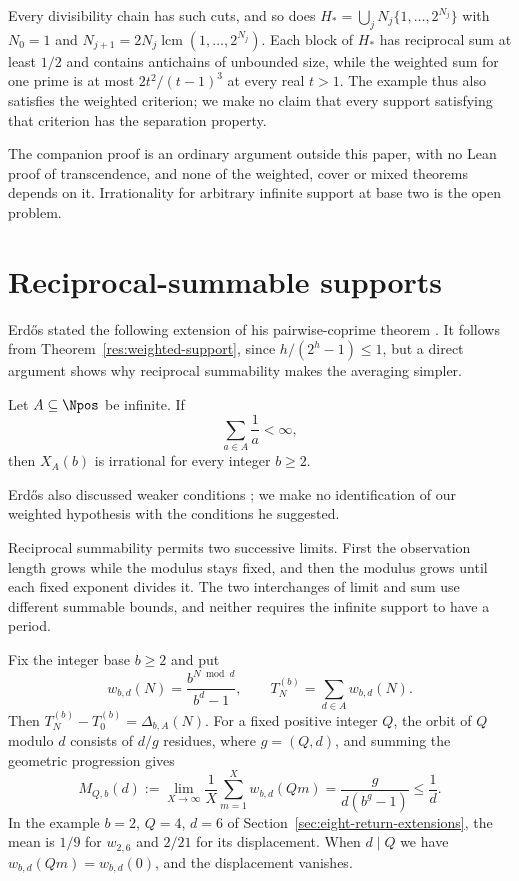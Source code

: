 \documentclass[11pt]{article}
\begin{document}
Every divisibility chain has such cuts, and so does
$H_* = \bigcup_j N_j\{1,\ldots,2^{N_j}\}$ with $N_0=1$ and
$N_{j+1}=2N_j\operatorname{lcm}(1,\ldots,2^{N_j})$. Each block of
$H_*$ has reciprocal sum at least $1/2$ and contains antichains of
unbounded size, while the weighted sum for one prime is at most
$2t^2/(t-1)^3$ at every real $t>1$. The example thus also satisfies
the weighted criterion; we make no claim that every support satisfying
that criterion has the separation property.

The companion proof is an ordinary argument outside this paper, with no
Lean proof of transcendence, and none of the weighted, cover or mixed
theorems depends on it. Irrationality for arbitrary infinite support at
base two is the open problem.

\appendix
\section{Reciprocal-summable supports}\label{sec:reciprocal-support}
Erd\H{o}s stated the following extension of his pairwise-coprime
theorem \cite[p.~222]{erdos1968}. It follows from
Theorem~\ref{res:weighted-support}, since $h/(2^h-1)\le1$, but a direct
argument shows why reciprocal summability makes the averaging simpler.

\begin{theorem}\label{res:reciprocal-support}
Let $A\subseteq\Npos$ be infinite.  If
\[
  \sum_{a\in A}\frac1a<\infty,
\]
then \(X_A(b)\) is irrational for every integer \(b\ge2\).
\end{theorem}

Erd\H{o}s also discussed weaker conditions \cite[pp.~222, 226]{erdos1968};
we make no identification of our weighted hypothesis with the conditions
he suggested.

Reciprocal summability permits two successive limits. First the
observation length grows while the modulus stays fixed, and then the
modulus grows until each fixed exponent divides it. The two
interchanges of limit and sum use different summable bounds, and
neither requires the infinite support to have a period.

Fix the integer base $b\ge2$ and put
\[
 w_{b,d}(N)=\frac{b^{N\bmod d}}{b^d-1},\qquad
 T_N^{(b)}=\sum_{d\in A}w_{b,d}(N).
\]
Then $T_N^{(b)}-T_0^{(b)}=\Delta_{b,A}(N)$. For a fixed positive
integer $Q$, the orbit of $Q$ modulo $d$ consists of $d/g$ residues,
where $g=(Q,d)$, and summing the geometric progression gives
\begin{equation}
 M_{Q,b}(d):=\lim_{X\to\infty}\frac1X\sum_{m=1}^Xw_{b,d}(Qm)
 =\frac{g}{d(b^g-1)}\le\frac1d.
 \label{eq:gcd-orbit-mean}
\end{equation}
In the example $b=2$, $Q=4$, $d=6$ of
Section~\ref{sec:eight-return-extensions}, the mean is $1/9$ for
$w_{2,6}$ and $2/21$ for its displacement. When $d\mid Q$ we have
$w_{b,d}(Qm)=w_{b,d}(0)$, and the displacement vanishes.
\end{document}
